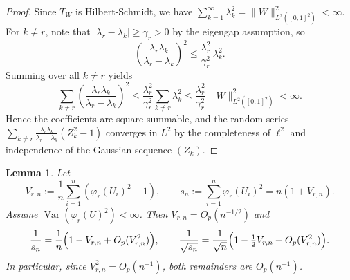\documentclass[11pt]{article}
\theoremstyle{plain}
\newtheorem{lemma}[theorem]{Lemma}
\theoremstyle{remark}
\DeclareMathOperator{\Var}{Var}
\begin{document}
\begin{proof}
Since \(T_W\) is Hilbert-Schmidt, we have 
\(\sum_{k=1}^\infty \lambda_k^2 = \|W\|_{L^2([0,1]^2)}^2 < \infty.\)
For \(k\neq r\), note that \(|\lambda_r - \lambda_k| \ge \gamma_r > 0\) by the eigengap assumption, so
\[
\left(\frac{\lambda_r\lambda_k}{\lambda_r - \lambda_k}\right)^2 
\le \frac{\lambda_r^2}{\gamma_r^2}\,\lambda_k^2.
\]
Summing over all \(k\neq r\) yields
\[
\sum_{k\neq r}\left(\frac{\lambda_r\lambda_k}{\lambda_r - \lambda_k}\right)^2
\le \frac{\lambda_r^2}{\gamma_r^2} \sum_{k\neq r}\lambda_k^2
\le \frac{\lambda_r^2}{\gamma_r^2}\|W\|_{L^2([0,1]^2)}^2 < \infty.
\]
Hence the coefficients are square-summable, and the random series
\(\sum_{k\neq r} \tfrac{\lambda_r\lambda_k}{\lambda_r - \lambda_k}(Z_k^2-1)\)
converges in \(L^2\) by the completeness of \(\ell^2\) and independence of the Gaussian sequence \((Z_k)\).
\end{proof}







\begin{lemma}\label{lem:norm}
Let
\[
V_{r,n}:=\frac{1}{n}\sum_{i=1}^n(\varphi_r(U_i)^2-1),
\qquad
s_n:=\sum_{i=1}^n \varphi_r(U_i)^2 = n(1+V_{r,n}).
\]
Assume $\Var(\varphi_r(U)^2)<\infty$. Then $V_{r,n}=O_p(n^{-1/2})$ and
\[
\frac{1}{s_n}
=
\frac{1}{n}\Bigl(1 - V_{r,n} + O_p(V_{r,n}^2)\Bigr),
\qquad
\frac{1}{\sqrt{s_n}}
=
\frac{1}{\sqrt{n}}\Bigl(1 - \tfrac{1}{2}V_{r,n} + O_p(V_{r,n}^2)\Bigr).
\]
In particular, since $V_{r,n}^2=O_p(n^{-1})$, both remainders are $O_p(n^{-1})$.
\end{lemma}
\end{document}
